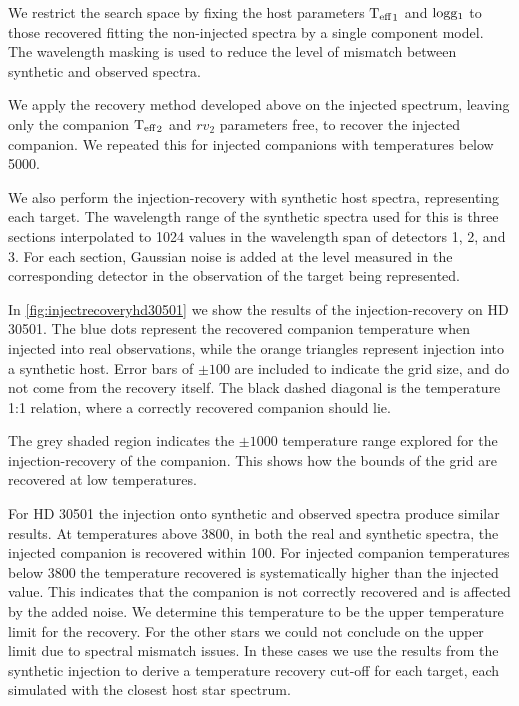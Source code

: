 We restrict the search space by fixing the host parameters \({\textrm{T}_{\mathrm{eff}}}_{1}\) and \(\textrm{logg}{}_1\) to those recovered fitting the non-injected spectra by a single component model.
The wavelength masking is used to reduce the level of mismatch between synthetic and observed spectra.

We apply the recovery method developed above on the injected spectrum, leaving only the companion \({\textrm{T}_{\mathrm{eff}}}_{2}\) and \({rv}_2\) parameters free, to recover the injected companion.
We repeated this for injected companions with temperatures below 5000\K{}.

We also perform the injection-recovery with synthetic host spectra, representing each target.
The wavelength range of the synthetic spectra used for this is three sections interpolated to 1024 values in the wavelength span of detectors 1, 2, and 3.
For each section, Gaussian noise is added at the level measured in the corresponding detector in the observation of the target being represented.

In \cref{fig:injectrecoveryhd30501} we show the results of the injection-recovery on {HD 30501}.
The blue dots represent the recovered companion temperature when injected into real observations, while the orange triangles represent injection into a synthetic host.
Error bars of \(\pm100\)\K{} are included to indicate the grid size, and do not come from the recovery itself.
The black dashed diagonal is the temperature 1:1 relation, where a correctly recovered companion should lie.

The grey shaded region indicates the \(\pm 1000\)\K{} temperature range explored for the injection-recovery of the companion.
This shows how the bounds of the grid are recovered at low temperatures.

For {HD 30501} the injection onto synthetic and observed spectra produce similar results.
At temperatures above 3800\K{}, in both the real and synthetic spectra, the injected companion is recovered within 100\K{}.
For injected companion temperatures below 3800\K{} the temperature recovered is systematically higher than the injected value.
This indicates that the companion is not correctly recovered and is affected by the added noise.
We determine this temperature to be the upper temperature limit for the recovery.
For the other stars we could not conclude on the upper limit due to spectral mismatch issues.
In these cases we use the results from the synthetic injection to derive a temperature recovery cut-off for each target, each simulated with the closest host star spectrum.

